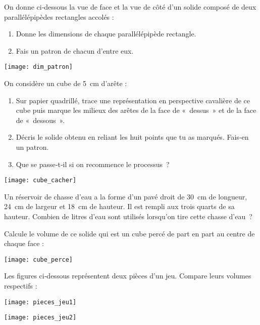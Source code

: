 \begin{exercice}[Patron]
On donne ci‑dessous la vue de face et la vue de côté d'un solide composé de deux parallélépipèdes rectangles accolés :
\begin{enumerate}
 \item Donne les dimensions de chaque parallélépipède rectangle.
 \item Fais un patron de chacun d'entre eux.
 \end{enumerate}
\begin{center} \texttt{[image: dim\_patron]} \end{center}
\end{exercice}


\begin{exercice}
On considère un cube de 5 cm d'arête :
\begin{enumerate}
 \item Sur papier quadrillé, trace une représentation en perspective cavalière de ce cube puis marque les milieux des arêtes de la face de « dessus » et de la face de « dessous ».
 \item Décris le solide obtenu en reliant les huit points que tu as marqués. Fais‑en un patron.
 \item Que se passe‑t‑il si on recommence le processus ?
 \end{enumerate}
 \begin{center} \texttt{[image: cube\_cacher]} \end{center}
\end{exercice}


\begin{exercice}
Un réservoir de chasse d'eau a la forme d'un pavé droit de 30 cm de longueur, 24 cm de largeur et 18 cm de hauteur. Il est rempli aux trois quarts de sa hauteur. Combien de litres d'eau sont utilisés lorsqu'on tire cette chasse d'eau ?
\end{exercice}


\begin{exercice}
Calcule le volume de ce solide qui est un cube percé de part en part au centre de chaque face :
 \begin{center} \texttt{[image: cube\_perce]} \end{center}
\end{exercice}


\begin{exercice}
Les figures ci‑dessous représentent deux pièces d'un jeu. Compare leurs volumes respectifs :
 \begin{center} \texttt{[image: pieces\_jeu1]} \end{center}
 
 \begin{center} \texttt{[image: pieces\_jeu2]} \end{center}
\end{exercice}



